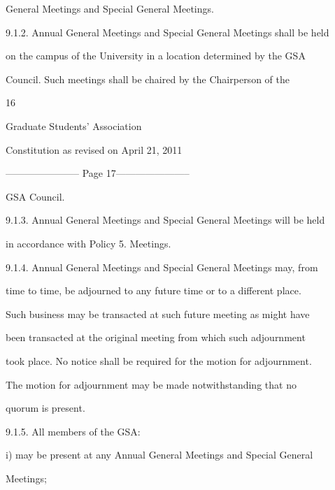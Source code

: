         General Meetings and Special General Meetings.  



9.1.2. Annual General Meetings and Special General Meetings shall be held  

        on the campus of the University in a location determined by the GSA  

        Council.  Such  meetings  shall  be  chaired  by  the  Chairperson  of  the  



                                               

                                            16  



                              Graduate Students’ Association  



                         Constitution as revised on April 21, 2011  


----------------------- Page 17-----------------------

        GSA Council.  



9.1.3. Annual General Meetings and Special General Meetings will be held  

        in accordance with Policy 5. Meetings.  



9.1.4. Annual  General  Meetings  and  Special  General  Meetings  may,  from  

        time to time, be adjourned to any future time or to a different place.  

        Such business may be transacted at such future meeting as might have  

        been transacted at the original meeting from which such adjournment  

        took place. No notice shall be required for the motion for adjournment.  

        The  motion  for  adjournment  may  be  made  notwithstanding  that  no  

        quorum is present.  



9.1.5. All members of the GSA:  



i)      may be present at any Annual General Meetings and Special General  

        Meetings;  



